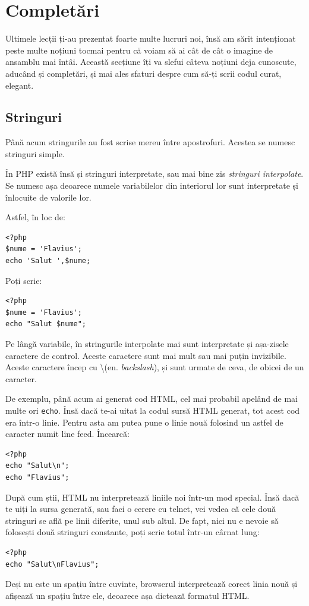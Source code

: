 \section{Completări}
Ultimele lecții ți-au prezentat foarte multe
lucruri noi, însă am sărit intenționat peste multe
noțiuni tocmai pentru că voiam să ai cât de cât
o imagine de ansamblu mai întâi. Această secțiune îți
va slefui câteva noțiuni deja cunoscute, aducând
și completări, și mai ales sfaturi despre
cum să-ți scrii codul curat, elegant.


\subsection{Stringuri}
Până acum stringurile au fost scrise mereu
între apostrofuri. Acestea se numesc stringuri simple.

În PHP există însă și stringuri interpretate,
sau mai bine zis \textsl{stringuri interpolate}. Se numesc
așa deoarece numele variabilelor din interiorul lor
sunt interpretate și înlocuite de valorile lor.

Astfel, în loc de:
\begin{lstlisting}
<?php
$nume = 'Flavius';
echo 'Salut ',$nume;
\end{lstlisting}
Poți scrie:
\begin{lstlisting}
<?php
$nume = 'Flavius';
echo "Salut $nume";
\end{lstlisting}

Pe lângă variabile, în stringurile interpolate
mai sunt interpretate și
așa-zisele caractere de control. Aceste caractere
sunt mai mult sau mai puțin {\glqq}invizibile{\grqq}. Aceste
caractere încep cu \textbackslash (en. \textsl{backslash}),
și sunt urmate de ceva, de obicei de un caracter.

De exemplu, până acum ai generat cod HTML,
cel mai probabil apelând de mai multe ori
\texttt{echo}. Însă dacă te-ai uitat la codul
sursă HTML generat, tot acest cod era într-o linie.
Pentru asta am putea pune o linie nouă folosind un astfel
de caracter numit line feed. Încearcă:
\begin{lstlisting}
<?php
echo "Salut\n";
echo "Flavius";
\end{lstlisting}
După cum știi, HTML nu interpretează liniile noi într-un mod
special.  Însă dacă te uiți la sursa generată, sau faci
o cerere cu telnet, vei vedea că cele două stringuri 
se află pe linii diferite, unul sub altul. De fapt, nici
nu e nevoie să folosești două stringuri constante, poți
scrie totul într-un cârnat lung:
\begin{lstlisting}
<?php
echo "Salut\nFlavius";
\end{lstlisting}
Deși nu este un spațiu între cuvinte, browserul interpretează
corect linia nouă și afișează un spațiu între ele, deoarece
așa dictează formatul HTML.

